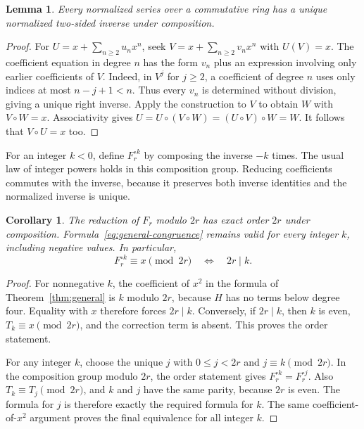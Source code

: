 \documentclass[11pt,a4paper]{article}
\newtheorem{lemma}[theorem]{Lemma}
\newtheorem{corollary}[theorem]{Corollary}
\theoremstyle{remark}
\begin{document}
\begin{lemma}\label{lem:inverse}
Every normalized series over a commutative ring has a unique
normalized two-sided inverse under composition.
\end{lemma}

\begin{proof}
For $U=x+\sum_{n\ge2}u_nx^n$, seek
$V=x+\sum_{n\ge2}v_nx^n$ with $U(V)=x$.
The coefficient equation in degree $n$ has the form $v_n$ plus
an expression involving only earlier coefficients of $V$.
Indeed, in $V^j$ for $j\ge2$, a coefficient of degree $n$ uses
only indices at most $n-j+1<n$. Thus every $v_n$ is determined
without division, giving a unique right inverse.
Apply the construction to $V$ to obtain $W$ with $V\circ W=x$.
Associativity gives
$U=U\circ(V\circ W)=(U\circ V)\circ W=W$.
It follows that $V\circ U=x$ too.
\end{proof}

For an integer $k<0$, define $F_r^{\circ k}$ by composing the inverse
$-k$ times. The usual law of integer powers holds in this composition
group. Reducing coefficients commutes with the inverse, because it
preserves both inverse identities and the normalized inverse is unique.

\begin{corollary}\label{cor:order}
The reduction of $F_r$ modulo $2r$ has exact order $2r$ under
composition. Formula~\eqref{eq:general-congruence} remains valid
for every integer $k$, including negative values. In particular,
\[
F_r^{\circ k}\equiv x\pmod{2r}
\quad\Longleftrightarrow\quad 2r\mid k.
\]
\end{corollary}

\begin{proof}
For nonnegative $k$, the coefficient of $x^2$ in the formula of
Theorem~\ref{thm:general} is $k$ modulo $2r$, because $H$ has
no terms below degree four. Equality with $x$ therefore forces
$2r\mid k$. Conversely, if $2r\mid k$, then $k$ is even,
$T_k\equiv x\pmod{2r}$, and the correction term is absent.
This proves the order statement.

For any integer $k$, choose the unique $j$ with
$0\le j<2r$ and $j\equiv k\pmod{2r}$. In the composition group
modulo $2r$, the order statement gives
$F_r^{\circ k}=F_r^{\circ j}$. Also $T_k\equiv T_j\pmod{2r}$,
and $k$ and $j$ have the same parity, because $2r$ is even.
The formula for $j$ is therefore exactly the required formula for
$k$. The same coefficient-of-$x^2$ argument proves the final
equivalence for all integer $k$.
\end{proof}
\end{document}
